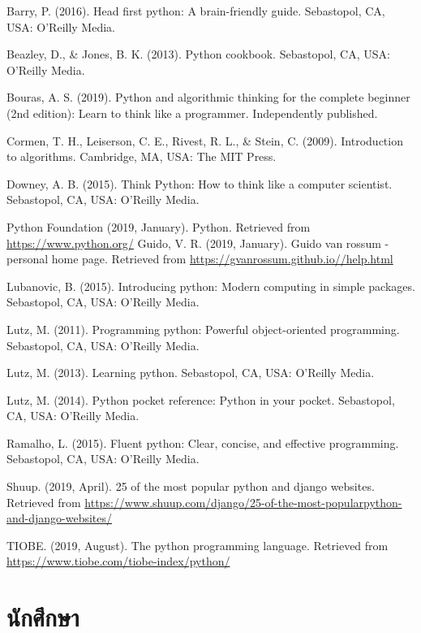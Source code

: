 \begin{hangparas}{10.0mm}{1}

Barry, P. (2016). Head first python: A brain-friendly guide. Sebastopol, CA, USA: O’Reilly Media.

Beazley, D., \& Jones, B. K. (2013). Python cookbook. Sebastopol, CA, USA: O’Reilly Media.

Bouras, A. S. (2019). Python and algorithmic thinking for the complete beginner (2nd edition): Learn to think like a programmer. Independently published.

Cormen, T. H., Leiserson, C. E., Rivest, R. L., \& Stein, C. (2009). Introduction to algorithms. Cambridge, MA, USA: The MIT Press.

Downey, A. B. (2015). Think Python: How to think like a computer scientist. Sebastopol, CA, USA: O’Reilly Media.

Python Foundation (2019, January). Python. Retrieved from \url{https://www.python.org/} Guido, V. R. (2019, January). Guido van rossum - personal home page. Retrieved from \url{https://gvanrossum.github.io//help.html}

Lubanovic, B. (2015). Introducing python: Modern computing in simple packages. Sebastopol, CA, USA: O’Reilly Media.

Lutz, M. (2011). Programming python: Powerful object-oriented programming. Sebastopol, CA, USA: O’Reilly Media.

Lutz, M. (2013). Learning python. Sebastopol, CA, USA: O’Reilly Media.

Lutz, M. (2014). Python pocket reference: Python in your pocket. Sebastopol, CA, USA: O’Reilly Media.

Ramalho, L. (2015). Fluent python: Clear, concise, and effective programming. Sebastopol, CA, USA: O’Reilly Media.

Shuup. (2019, April). 25 of the most popular python and django websites. Retrieved from \url{https://www.shuup.com/django/25-of-the-most-popularpython-and-django-websites/}

TIOBE. (2019, August). The python programming language. Retrieved from \\ \url{https://www.tiobe.com/tiobe-index/python/}

\end{hangparas}

\section*{นักศึกษา}

